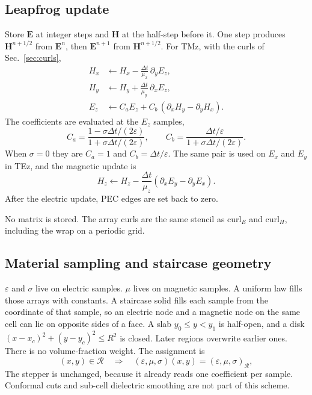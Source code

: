 \documentclass[11pt,a4paper]{article}
\numberwithin{equation}{section}
\begin{document}
\subsection{Leapfrog update}
\label{sec:leapfrog}

Store $\mathbf{E}$ at integer steps and $\mathbf{H}$ at the half-step before
it. One step produces $\mathbf{H}^{n+1/2}$ from $\mathbf{E}^n$, then
$\mathbf{E}^{n+1}$ from $\mathbf{H}^{n+1/2}$. For TMz, with the curls of
Sec.~\ref{sec:curls},
\begin{align}
H_x &\leftarrow H_x - \frac{\Delta t}{\mu_x}\,\partial_y E_z, \label{eq:upd-hx}\\
H_y &\leftarrow H_y + \frac{\Delta t}{\mu_y}\,\partial_x E_z, \label{eq:upd-hy}\\
E_z &\leftarrow C_a E_z + C_b\,(\partial_x H_y - \partial_y H_x). \label{eq:upd-ez}
\end{align}
The coefficients are evaluated at the $E_z$ samples,
\begin{equation}
C_a = \frac{1-\sigma\Delta t/(2\varepsilon)}{1+\sigma\Delta t/(2\varepsilon)},
\qquad
C_b = \frac{\Delta t/\varepsilon}{1+\sigma\Delta t/(2\varepsilon)}.
\label{eq:ca-cb}
\end{equation}
When $\sigma=0$ they are $C_a=1$ and $C_b=\Delta t/\varepsilon$. The same pair
is used on $E_x$ and $E_y$ in TEz, and the magnetic update is
\begin{equation}
H_z \leftarrow H_z - \frac{\Delta t}{\mu_z}(\partial_x E_y - \partial_y E_x).
\label{eq:upd-hz}
\end{equation}
After the electric update, PEC edges are set back to zero.

No matrix is stored. The array curls are the same stencil as
$\mathrm{curl}_E$ and $\mathrm{curl}_H$, including the wrap on a periodic grid.

\subsection{Material sampling and staircase geometry}
\label{sec:sampling}

$\varepsilon$ and $\sigma$ live on electric samples. $\mu$ lives on magnetic
samples. A uniform law fills those arrays with constants. A staircase solid
fills each sample from the coordinate of that sample, so an electric node and
a magnetic node on the same cell can lie on opposite sides of a face. A slab
$y_0\le y<y_1$ is half-open, and a disk $(x-x_c)^2+(y-y_c)^2\le R^2$ is
closed. Later regions overwrite earlier ones. There is no volume-fraction
weight. The assignment is
\begin{equation}
(x,y)\in\mathcal{R}
\quad\Longrightarrow\quad
(\varepsilon,\mu,\sigma)(x,y)=(\varepsilon,\mu,\sigma)_{\mathcal{R}},
\label{eq:staircase}
\end{equation}
The stepper is unchanged, because it already reads one coefficient per sample.
Conformal cuts and sub-cell dielectric smoothing are not part of this scheme.
\end{document}
